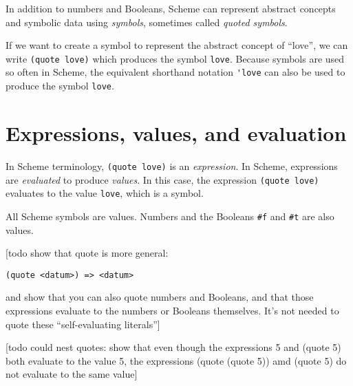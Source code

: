 \documentclass{book}
\begin{document}
In addition to numbers and Booleans, Scheme can represent abstract concepts and symbolic data using \emph{symbols}, sometimes called \emph{quoted symbols}.

If we want to create a symbol to represent the abstract concept of ``love'', we can write \verb|(quote love)| which produces the symbol \verb|love|.  Because symbols are used so often in Scheme, the equivalent shorthand notation \verb|'love| can also be used to produce the symbol \verb|love|.

\section{Expressions, values, and evaluation}

In Scheme terminology, \verb|(quote love)| is an \emph{expression}.
In Scheme, expressions are \emph{evaluated} to produce \emph{values}.
In this case, the expression \verb|(quote love)| evaluates to the value \verb|love|, which is a symbol. 

All Scheme symbols are values.  Numbers and the Booleans \verb|#f| and \verb|#t| are also values.

[todo show that quote is more general:

\verb|(quote <datum>) => <datum>|
  
 and show that you can also quote numbers and Booleans, and that those expressions evaluate to the numbers or Booleans themselves.  It's not needed to quote these
``self-evaluating literals'']

[todo could nest quotes: show that even though the expressions 5 and (quote 5) both evaluate to the value 5, the expressions (quote (quote 5)) amd (quote 5) do not evaluate to the same value]







\end{document}
